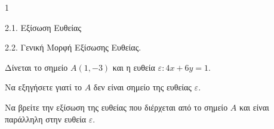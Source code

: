 \begin{ylh}{1}
    \item 2.1. Εξίσωση Ευθείας
    \item 2.2. Γενική Μορφή Εξίσωσης Ευθείας.
\end{ylh}
Δίνεται το σημείο $A(1, -3)$ και η ευθεία $\varepsilon: 4x + 6y = 1$.
\begin{alist}
\item Να εξηγήσετε γιατί το $A$ δεν είναι σημείο της ευθείας $\varepsilon$. 
\item Να βρείτε την εξίσωση της ευθείας που διέρχεται από το σημείο $A$ και είναι παράλληλη στην ευθεία $\varepsilon$. 
\end{alist}